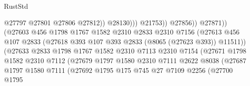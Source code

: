 \begin{lexlean}{RustStd}
\begin{coremodule}
                                                      @27797
                                                      @27801
                                                      @27806
                                                      @27812))
                                                  @28130)))
                                            @21753))
                                        @27856))
                                    @27871))
                                (@27603
                                  @456
                                  @1798
                                  @1767
                                  @1582
                                  @2310
                                  @2833
                                  @2310
                                  @7156
                                  (@27613
                                    @456
                                    @107
                                    @2833
                                    (@27618 @393 @107 @393 @2833 (@8065 (@27623 @393)) @11511))
                                  (@27633
                                    @2833
                                    @1798
                                    @1767
                                    @1582
                                    @2310
                                    @7113
                                    @2310
                                    @7154
                                    (@27671
                                      @1798
                                      @1582
                                      @2310
                                      @7112
                                      (@27679
                                        @1797
                                        @1580
                                        @2310
                                        @7111
                                        @2622
                                        @8038
                                        (@27687
                                          @1797
                                          @1580
                                          @7111
                                          (@27692
                                            @1795
                                            @175
                                            @745
                                            @27
                                            @7109
                                            @2256
                                            (@27700
                                              @1795

\end{coremodule}
\end{lexlean}
